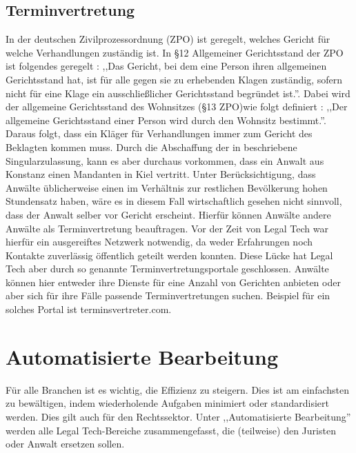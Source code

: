 \subsection{Terminvertretung} \label{Terminvertetung}
In der deutschen Zivilprozessordnung (ZPO) ist geregelt, welches Gericht für welche Verhandlungen zuständig ist. In §12 Allgemeiner Gerichtsstand der ZPO ist folgendes geregelt : ,,Das Gericht, bei dem eine Person ihren allgemeinen Gerichtsstand hat, ist für alle gegen sie zu erhebenden Klagen zuständig, sofern nicht für eine Klage ein ausschließlicher Gerichtsstand begründet ist.''. Dabei wird der allgemeine Gerichtsstand des Wohnsitzes (§13 ZPO)wie folgt definiert : ,,Der allgemeine Gerichtsstand einer Person wird durch den Wohnsitz bestimmt.''. Daraus folgt, dass ein Kläger für Verhandlungen immer zum Gericht des Beklagten kommen muss. Durch die Abschaffung der in  beschriebene Singularzulassung, kann es aber durchaus vorkommen, dass ein Anwalt aus Konstanz einen Mandanten in Kiel vertritt. Unter Berücksichtigung, dass Anwälte üblicherweise einen im Verhältnis zur restlichen Bevölkerung hohen Stundensatz haben, wäre es in diesem Fall wirtschaftlich gesehen nicht sinnvoll, dass der Anwalt selber vor Gericht erscheint. Hierfür können Anwälte andere Anwälte als Terminvertretung beauftragen. Vor der Zeit von Legal Tech war hierfür ein ausgereiftes Netzwerk notwendig, da weder Erfahrungen noch Kontakte zuverlässig öffentlich geteilt werden konnten. Diese Lücke hat Legal Tech aber durch so genannte Terminvertretungsportale geschlossen. Anwälte können hier entweder ihre Dienste für eine Anzahl von Gerichten anbieten oder aber sich für ihre Fälle passende Terminvertretungen suchen. Beispiel für ein solches Portal ist terminsvertreter.com.

\section{Automatisierte Bearbeitung}
Für alle Branchen ist es wichtig, die Effizienz zu steigern. Dies ist am einfachsten zu bewältigen, indem wiederholende Aufgaben minimiert oder standardisiert werden. Dies gilt auch für den Rechtssektor.
Unter ,,Automatisierte Bearbeitung'' werden alle Legal Tech-Bereiche zusammengefasst, die (teilweise) den Juristen oder Anwalt ersetzen sollen.

